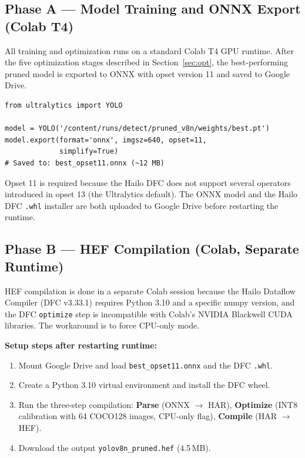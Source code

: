 \documentclass[journal, onecolumn]{IEEEtran}
\begin{document}
\subsection{Phase A — Model Training and ONNX Export (Colab T4)}
\label{sec:phaseA}

All training and optimization runs on a standard Colab T4 GPU runtime. After the five optimization stages described in Section~\ref{sec:opt}, the best-performing pruned model is exported to ONNX with opset version 11 and saved to Google Drive.

\begin{lstlisting}[caption={Export pruned model to opset-11 ONNX for DFC compatibility},label=lst:onnx]
from ultralytics import YOLO

model = YOLO('/content/runs/detect/pruned_v8n/weights/best.pt')
model.export(format='onnx', imgsz=640, opset=11,
             simplify=True)
# Saved to: best_opset11.onnx (~12 MB)
\end{lstlisting}

\noindent Opset 11 is required because the Hailo DFC does not support several operators introduced in opset 13 (the Ultralytics default). The ONNX model and the Hailo DFC \texttt{.whl} installer are both uploaded to Google Drive before restarting the runtime.

\subsection{Phase B — HEF Compilation (Colab, Separate Runtime)}
\label{sec:phaseB}

HEF compilation is done in a separate Colab session because the Hailo Dataflow Compiler (DFC v3.33.1) requires Python 3.10 and a specific numpy version, and the DFC \texttt{optimize} step is incompatible with Colab's NVIDIA Blackwell CUDA libraries. The workaround is to force CPU-only mode.

\textbf{Setup steps after restarting runtime:}
\begin{enumerate}
  \item Mount Google Drive and load \texttt{best\_opset11.onnx} and the DFC \texttt{.whl}.
  \item Create a Python 3.10 virtual environment and install the DFC wheel.
  \item Run the three-step compilation: \textbf{Parse} (ONNX $\to$ HAR), \textbf{Optimize} (INT8 calibration with 64 COCO128 images, CPU-only flag), \textbf{Compile} (HAR $\to$ HEF).
  \item Download the output \texttt{yolov8n\_pruned.hef} (4.5\,MB).
\end{enumerate}
\end{document}

